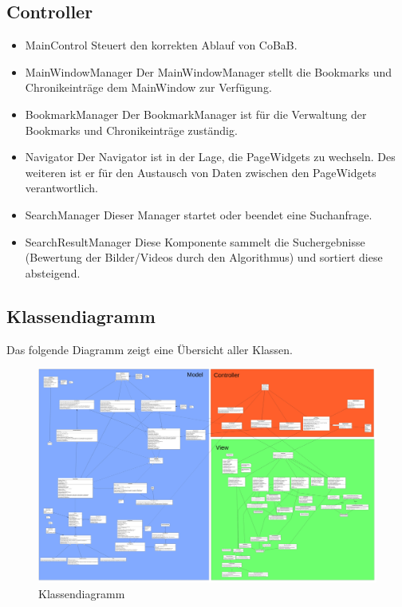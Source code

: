 \subsection*{Controller}
\begin{itemize}
\item MainControl \newline
Steuert den korrekten Ablauf von CoBaB.

\item MainWindowManager \newline
Der MainWindowManager stellt die Bookmarks und Chronikeinträge dem MainWindow zur Verfügung.

\item BookmarkManager \newline
Der BookmarkManager ist für die Verwaltung der Bookmarks und Chronikeinträge zuständig.

\item Navigator \newline
Der Navigator ist in der Lage, die PageWidgets zu wechseln. Des weiteren ist er für den Austausch von Daten zwischen den PageWidgets verantwortlich.

\item SearchManager \newline
Dieser Manager startet oder beendet eine Suchanfrage.

\item SearchResultManager \newline
Diese Komponente sammelt die Suchergebnisse (Bewertung der Bilder/Videos durch den Algorithmus) und sortiert diese absteigend.
\end{itemize}
\pagebreak


\subsection{Klassendiagramm}

Das folgende Diagramm zeigt eine Übersicht aller Klassen.

\begin{figure}[H]
	\includegraphics[width=1\linewidth]{img/Klassendiagramm/Complete}
	\caption{Klassendiagramm}
	\label{fig:klassendiagramm}
\end{figure}


